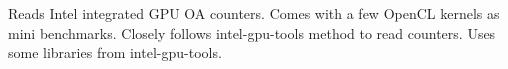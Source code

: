 Reads Intel integrated G\+PU OA counters. Comes with a few Open\+CL kernels as mini benchmarks. Closely follows intel-\/gpu-\/tools method to read counters. Uses some libraries from intel-\/gpu-\/tools. 